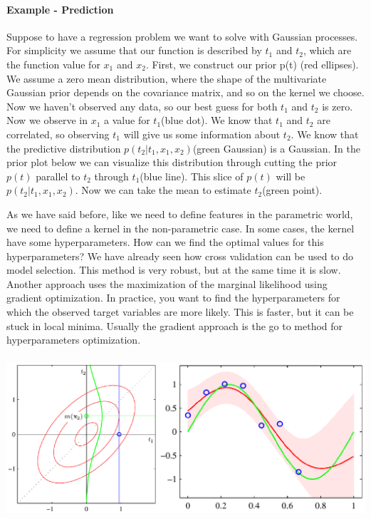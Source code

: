 \documentclass[../main.tex]{subfiles}
\begin{document}
\paragraph{Example - Prediction} Suppose to have a regression problem we want to solve with Gaussian processes. For simplicity we assume that our function is described by $t_1$ and $t_2$, which are the function value for $x_1$ and $x_2$.
First, we construct our prior p(t) (red ellipses). We assume a zero mean distribution, where the shape of the multivariate Gaussian prior depends on the covariance matrix, and so on the kernel we choose. Now we haven't observed any data, so our best guess for both $t_1$ and $t_2$ is zero. Now we observe in $x_1$ a value for $t_1$(blue dot). We know that $t_1$ and $t_2$ are correlated, so observing $t_1$ will give us some information about $t_2$. We know that the predictive distribution $p(t_2|t_1, x_1, x_2)$(green Gaussian) is a Gaussian. In the prior plot below we can visualize this distribution through cutting the prior $p(t)$ parallel to $t_2$ through $t_1$(blue line). This slice of $p(t)$ will be $p(t_2|t_1, x_1, x_2)$. Now we can take the mean to estimate $t_2$(green point).

As we have said before, like we need to define features in the parametric world, we need to define a kernel in the non-parametric case. In some cases, the kernel have some hyperparameters. How can we find the optimal values for this hyperparameters?
We have already seen how cross validation can be used to do model selection. This method is very robust, but at the same time it is slow. Another approach uses the maximization of the marginal likelihood using gradient optimization. In practice, you want to find the hyperparameters for which the observed target variables are more likely. This is faster, but it can be stuck in local minima. Usually the gradient approach is the go to method for hyperparameters optimization.
\begin{center}
    \includegraphics[height=60mm]{images/GaussianProcessExample.PNG}
\end{center}

\newpage
\end{document}
